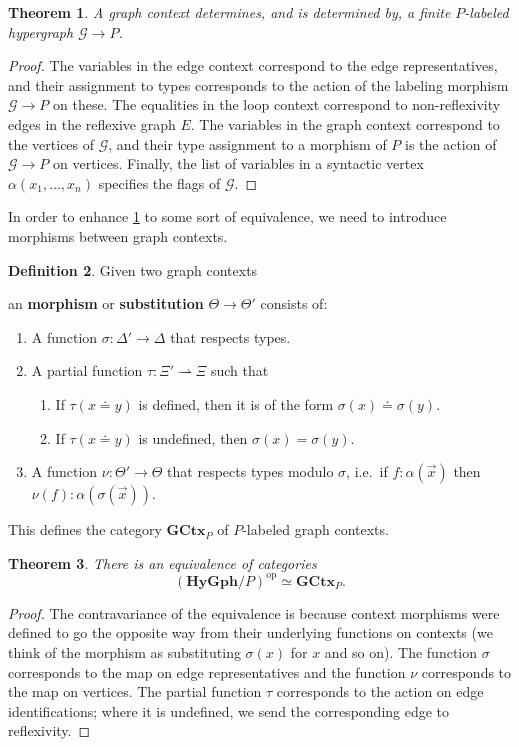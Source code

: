 \documentclass{article}
\newtheorem{thm}{Theorem}[section]
\theoremstyle{definition}
\newtheorem{defn}[thm]{Definition}
\theoremstyle{remark}
\def\G{\mathcal{G}}
\def\op{^{\mathrm{op}}}
\def\hy{\mathbf{HyGph}}
\def\GCtx{\mathbf{GCtx}}
\def\graph{\;\mathsf{graph}}
\let\types\vdash
\begin{document}
\begin{thm}\label{thm:ctx-hy}
  A graph context determines, and is determined by, a finite $P$-labeled hypergraph $\G\to P$.
\end{thm}
\begin{proof}
  The variables in the edge context correspond to the edge representatives, and their assignment to types corresponds to the action of the labeling morphism $\G\to P$ on these.
  The equalities in the loop context correspond to non-reflexivity edges in the reflexive graph $E$.
  The variables in the graph context correspond to the vertices of $\G$, and their type assignment to a morphism of $P$ is the action of $\G\to P$ on vertices.
  Finally, the list of variables in a syntactic vertex $\alpha(x_1,\dots,x_n)$ specifies the flags of $\G$.
\end{proof}

In order to enhance \cref{thm:ctx-hy} to some sort of equivalence, we need to introduce morphisms between graph contexts.

\begin{defn}
  Given two graph contexts
  an \textbf{morphism} or \textbf{substitution} $\Theta\to\Theta'$ consists of:
  \begin{enumerate}
  \item A function $\sigma : \Delta' \to \Delta$ that respects types.
  \item A partial function $\tau : \Xi' \rightharpoonup \Xi$ such that
    \begin{enumerate}
    \item If $\tau(x\doteq y)$ is defined, then it is of the form $\sigma(x)\doteq \sigma(y)$.
    \item If $\tau(x\doteq y)$ is undefined, then $\sigma(x)=\sigma(y)$.
    \end{enumerate}
  \item A function $\nu : \Theta' \to \Theta$ that respects types modulo $\sigma$, i.e.\ if $f:\alpha(\vec x)$ then $\nu(f) : \alpha(\sigma(\vec x))$.
  \end{enumerate}
  This defines the category $\GCtx_P$ of $P$-labeled graph contexts.
\end{defn}

\begin{thm}\label{thm:hyctx}
  There is an equivalence of categories
  \[ (\hy/P)\op \simeq \GCtx_P. \]
\end{thm}
\begin{proof}
  The contravariance of the equivalence is because context morphisms were defined to go the opposite way from their underlying functions on contexts (we think of the morphism as substituting $\sigma(x)$ for $x$ and so on).
  The function $\sigma$ corresponds to the map on edge representatives and the function $\nu$ corresponds to the map on vertices.
  The partial function $\tau$ corresponds to the action on edge identifications; where it is undefined, we send the corresponding edge to reflexivity.
\end{proof}
\end{document}
